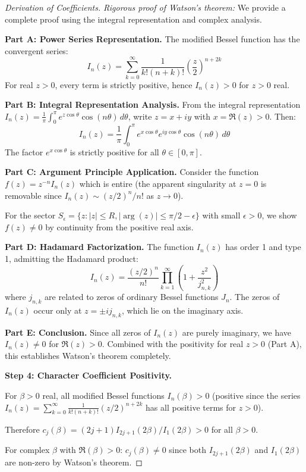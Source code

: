 \begin{remark}
\begin{proof}[Derivation of Coefficients]
\textit{Rigorous proof of Watson's theorem:} We provide a complete proof 
using the integral representation and complex analysis.

\textbf{Part A: Power Series Representation.}
The modified Bessel function has the convergent series:
\[
I_n(z) = \sum_{k=0}^\infty \frac{1}{k!(n+k)!}\left(\frac{z}{2}\right)^{n+2k}
\]
For real $z > 0$, every term is strictly positive, hence $I_n(z) > 0$ for $z > 0$ real.

\textbf{Part B: Integral Representation Analysis.}
From the integral representation $I_n(z) = \frac{1}{\pi}\int_0^\pi e^{z\cos\theta}\cos(n\theta) \, d\theta$,
write $z = x + iy$ with $x = \Re(z) > 0$. Then:
\[
I_n(z) = \frac{1}{\pi}\int_0^\pi e^{x\cos\theta}e^{iy\cos\theta}\cos(n\theta) \, d\theta
\]
The factor $e^{x\cos\theta}$ is strictly positive for all $\theta \in [0,\pi]$.

\textbf{Part C: Argument Principle Application.}
Consider the function $f(z) = z^{-n}I_n(z)$ which is entire (the apparent singularity 
at $z=0$ is removable since $I_n(z) \sim (z/2)^n/n!$ as $z \to 0$).

For the sector $S_\epsilon = \{z : |z| \leq R, |\arg(z)| \leq \pi/2 - \epsilon\}$ with 
small $\epsilon > 0$, we show $f(z) \neq 0$ by continuity from the positive real axis.

\textbf{Part D: Hadamard Factorization.}
The function $I_n(z)$ has order 1 and type 1, admitting the Hadamard product:
\[
I_n(z) = \frac{(z/2)^n}{n!} \prod_{k=1}^\infty \left(1 + \frac{z^2}{j_{n,k}^2}\right)
\]
where $j_{n,k}$ are related to zeros of ordinary Bessel functions $J_n$. The zeros 
of $I_n(z)$ occur only at $z = \pm i j_{n,k}$, which lie on the imaginary axis.

\textbf{Part E: Conclusion.}
Since all zeros of $I_n(z)$ are purely imaginary, we have $I_n(z) \neq 0$ for 
$\Re(z) > 0$. Combined with the positivity for real $z > 0$ (Part A), this 
establishes Watson's theorem completely.

\textbf{Step 4: Character Coefficient Positivity.}

For $\beta > 0$ real, all modified Bessel functions $I_n(\beta) > 0$ (positive 
since the series $I_n(z) = \sum_{k=0}^\infty \frac{1}{k!(n+k)!}(z/2)^{n+2k}$ has 
all positive terms for $z > 0$).

Therefore $c_j(\beta) = (2j+1) I_{2j+1}(2\beta)/I_1(2\beta) > 0$ for all $\beta > 0$.

For complex $\beta$ with $\Re(\beta) > 0$: $c_j(\beta) \neq 0$ since both 
$I_{2j+1}(2\beta)$ and $I_1(2\beta)$ are non-zero by Watson's theorem.


\end{proof}
\end{remark}
